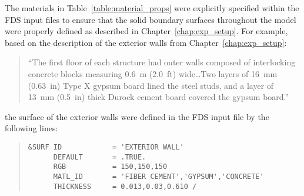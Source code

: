 \FloatBarrier
The materials in Table~\ref{table:material_props} were explicitly specified within the FDS input files to ensure that the solid boundary surfaces throughout the model were properly defined as described in Chapter~\ref{chap:exp_setup}. For example, based on the description of the exterior walls from Chapter~\ref{chap:exp_setup}:  
\begin{quote}
``The first floor of each structure had outer walls composed of interlocking concrete blocks measuring 0.6~m (2.0~ft) wide\ldots Two layers of 16~mm (0.63~in) Type X gypsum board lined the steel studs, and a layer of 13~mm (0.5~in) thick Durock cement board covered the gypsum board.''
\end{quote}
the surface of the exterior walls were defined in the FDS input file by the following lines:
\begin{quote}
\begin{verbatim}
&SURF ID            = 'EXTERIOR WALL'
      DEFAULT       = .TRUE.
      RGB           = 150,150,150
      MATL_ID       = 'FIBER CEMENT','GYPSUM','CONCRETE'
      THICKNESS     = 0.013,0.03,0.610 /
\end{verbatim}
\end{quote}

